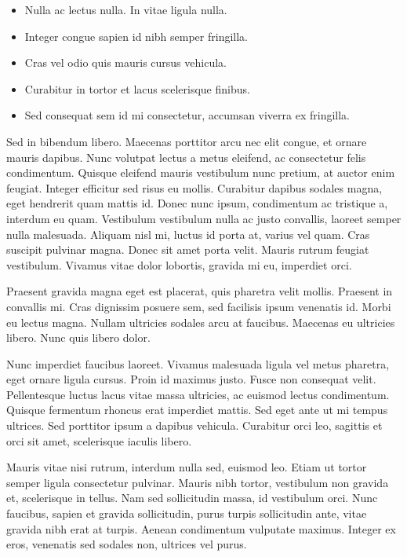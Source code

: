 \documentclass[
]{book}
\begin{document}
\begin{itemize}
\item
  Nulla ac lectus nulla. In vitae ligula nulla.
\item
  Integer congue sapien id nibh semper fringilla.
\item
  Cras vel odio quis mauris cursus vehicula.
\end{itemize}

\begin{itemize}
\item
  Curabitur in tortor et lacus scelerisque finibus.
\item
  Sed consequat sem id mi consectetur, accumsan viverra ex fringilla.
\end{itemize}

Sed in bibendum libero. Maecenas porttitor arcu nec elit congue, et
ornare mauris dapibus. Nunc volutpat lectus a metus eleifend, ac
consectetur felis condimentum. Quisque eleifend mauris vestibulum nunc
pretium, at auctor enim feugiat. Integer efficitur sed risus eu mollis.
Curabitur dapibus sodales magna, eget hendrerit quam mattis id. Donec
nunc ipsum, condimentum ac tristique a, interdum eu quam. Vestibulum
vestibulum nulla ac justo convallis, laoreet semper nulla malesuada.
Aliquam nisl mi, luctus id porta at, varius vel quam. Cras suscipit
pulvinar magna. Donec sit amet porta velit. Mauris rutrum feugiat
vestibulum. Vivamus vitae dolor lobortis, gravida mi eu, imperdiet orci.

Praesent gravida magna eget est placerat, quis pharetra velit mollis.
Praesent in convallis mi. Cras dignissim posuere sem, sed facilisis
ipsum venenatis id. Morbi eu lectus magna. Nullam ultricies sodales arcu
at faucibus. Maecenas eu ultricies libero. Nunc quis libero dolor.

Nunc imperdiet faucibus laoreet. Vivamus malesuada ligula vel metus
pharetra, eget ornare ligula cursus. Proin id maximus justo. Fusce non
consequat velit. Pellentesque luctus lacus vitae massa ultricies, ac
euismod lectus condimentum. Quisque fermentum rhoncus erat imperdiet
mattis. Sed eget ante ut mi tempus ultrices. Sed porttitor ipsum a
dapibus vehicula. Curabitur orci leo, sagittis et orci sit amet,
scelerisque iaculis libero.

Mauris vitae nisi rutrum, interdum nulla sed, euismod leo. Etiam ut
tortor semper ligula consectetur pulvinar. Mauris nibh tortor,
vestibulum non gravida et, scelerisque in tellus. Nam sed sollicitudin
massa, id vestibulum orci. Nunc faucibus, sapien et gravida
sollicitudin, purus turpis sollicitudin ante, vitae gravida nibh erat at
turpis. Aenean condimentum vulputate maximus. Integer ex eros, venenatis
sed sodales non, ultrices vel purus.
\end{document}
